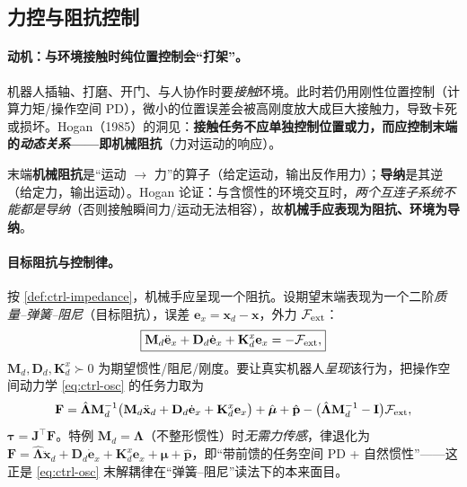 \subsection{力控与阻抗控制}
\label{sec:ctrl-robot-impedance}

\paragraph{动机：与环境接触时纯位置控制会“打架”。}
机器人插轴、打磨、开门、与人协作时要\emph{接触}环境。此时若仍用刚性位置控制（计算力矩/操作空间 PD），微小的位置误差会被高刚度放大成巨大接触力，导致卡死或损坏。Hogan（1985）的洞见\cite{hogan1985impedance}：\textbf{接触任务不应单独控制位置或力，而应控制末端的\emph{动态关系}——即机械阻抗}（力对运动的响应）。

\begin{definition}[机械阻抗与导纳]
\label{def:ctrl-impedance}
末端\textbf{机械阻抗}是“运动 $\to$ 力”的算子（给定运动，输出反作用力）；\textbf{导纳}是其逆（给定力，输出运动）\cite{hogan1985impedance}。Hogan 论证：与含惯性的环境交互时，\emph{两个互连子系统不能都是导纳}（否则接触瞬间力/运动无法相容），故\textbf{机械手应表现为阻抗、环境为导纳}。
\end{definition}

\paragraph{目标阻抗与控制律。}
按 \cref{def:ctrl-impedance}，机械手应呈现一个阻抗。设期望末端表现为一个二阶\emph{质量--弹簧--阻尼}（目标阻抗），误差 $\mathbf{e}_x=\mathbf{x}_d-\mathbf{x}$，外力 $\mathcal{F}_{\rm ext}$\cite{hogan1985impedance}：
\begin{equation}
  \boxed{\mathbf{M}_d\ddot{\mathbf{e}}_x+\mathbf{D}_d\dot{\mathbf{e}}_x+\mathbf{K}_d^x\mathbf{e}_x=-\mathcal{F}_{\rm ext},}
  \label{eq:ctrl-impedance}
\end{equation}
$\mathbf{M}_d,\mathbf{D}_d,\mathbf{K}_d^x\succ0$ 为期望惯性/阻尼/刚度。要让真实机器人\emph{呈现}该行为，把操作空间动力学 \cref{eq:ctrl-osc} 的任务力取为
\begin{equation}
  \mathbf{F}=\hat{\boldsymbol{\Lambda}}\mathbf{M}_d^{-1}\big(\mathbf{M}_d\ddot{\mathbf{x}}_d+\mathbf{D}_d\dot{\mathbf{e}}_x+\mathbf{K}_d^x\mathbf{e}_x\big)+\hat{\boldsymbol{\mu}}+\hat{\mathbf{p}}-\big(\hat{\boldsymbol{\Lambda}}\mathbf{M}_d^{-1}-\mathbf{I}\big)\mathcal{F}_{\rm ext},
  \label{eq:ctrl-impedance-law}
\end{equation}
$\boldsymbol{\tau}=\mathbf{J}^\top\mathbf{F}$。特例 $\mathbf{M}_d=\boldsymbol{\Lambda}$（不整形惯性）时\emph{无需力传感}，律退化为 $\mathbf{F}=\hat{\boldsymbol{\Lambda}}\ddot{\mathbf{x}}_d+\mathbf{D}_d\dot{\mathbf{e}}_x+\mathbf{K}_d^x\mathbf{e}_x+\hat{\boldsymbol{\mu}}+\hat{\mathbf{p}}$，即“带前馈的任务空间 PD + 自然惯性”——这正是 \cref{eq:ctrl-osc} 末解耦律在“弹簧--阻尼”读法下的本来面目。

